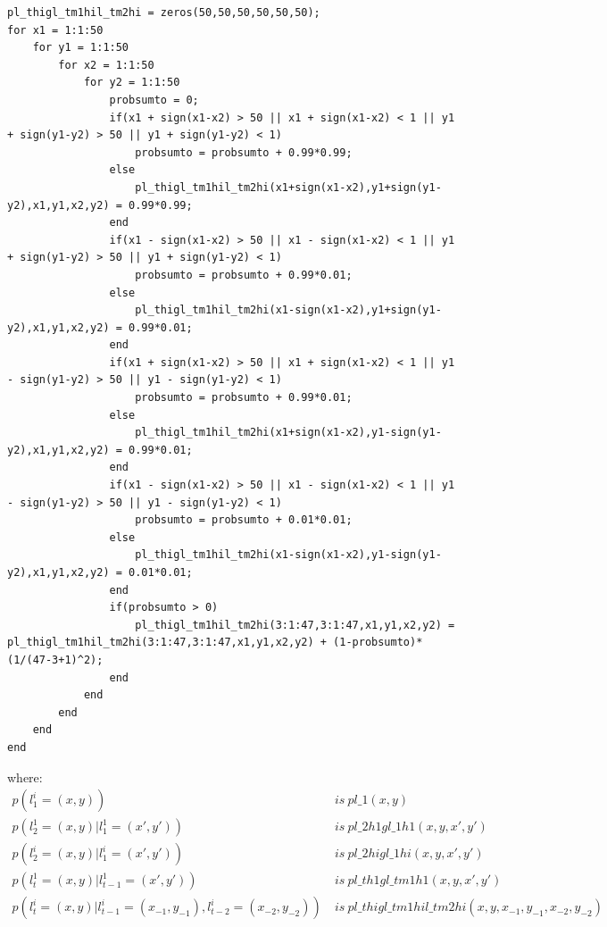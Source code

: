 \documentclass[11pt,a4paper,oneside]{report}
\begin{document}
\begin{lstlisting}
pl_thigl_tm1hil_tm2hi = zeros(50,50,50,50,50,50);
for x1 = 1:1:50
    for y1 = 1:1:50
        for x2 = 1:1:50
            for y2 = 1:1:50
                probsumto = 0;
                if(x1 + sign(x1-x2) > 50 || x1 + sign(x1-x2) < 1 || y1 + sign(y1-y2) > 50 || y1 + sign(y1-y2) < 1)
                    probsumto = probsumto + 0.99*0.99;
                else
                    pl_thigl_tm1hil_tm2hi(x1+sign(x1-x2),y1+sign(y1-y2),x1,y1,x2,y2) = 0.99*0.99;
                end
                if(x1 - sign(x1-x2) > 50 || x1 - sign(x1-x2) < 1 || y1 + sign(y1-y2) > 50 || y1 + sign(y1-y2) < 1)
                    probsumto = probsumto + 0.99*0.01;
                else
                    pl_thigl_tm1hil_tm2hi(x1-sign(x1-x2),y1+sign(y1-y2),x1,y1,x2,y2) = 0.99*0.01;
                end
                if(x1 + sign(x1-x2) > 50 || x1 + sign(x1-x2) < 1 || y1 - sign(y1-y2) > 50 || y1 - sign(y1-y2) < 1)
                    probsumto = probsumto + 0.99*0.01;
                else
                    pl_thigl_tm1hil_tm2hi(x1+sign(x1-x2),y1-sign(y1-y2),x1,y1,x2,y2) = 0.99*0.01;
                end
                if(x1 - sign(x1-x2) > 50 || x1 - sign(x1-x2) < 1 || y1 - sign(y1-y2) > 50 || y1 - sign(y1-y2) < 1)
                    probsumto = probsumto + 0.01*0.01;
                else
                    pl_thigl_tm1hil_tm2hi(x1-sign(x1-x2),y1-sign(y1-y2),x1,y1,x2,y2) = 0.01*0.01;
                end
                if(probsumto > 0)
                    pl_thigl_tm1hil_tm2hi(3:1:47,3:1:47,x1,y1,x2,y2) = pl_thigl_tm1hil_tm2hi(3:1:47,3:1:47,x1,y1,x2,y2) + (1-probsumto)*(1/(47-3+1)^2);
                end
            end
        end
    end
end
\end{lstlisting}

where:\\
\begin{align*}
p(l_1^i=(x,y))&\ is\ pl\_1(x,y)\\
p(l_2^1=(x,y)|l_1^1=(x',y'))&\ is\ pl\_2h1gl\_1h1(x,y,x',y')\\
p(l_2^i=(x,y)|l_1^i=(x',y'))&\ is\ pl\_2higl\_1hi(x,y,x',y')\\
p(l_t^1=(x,y)|l_{t-1}^1=(x',y'))&\ is\ pl\_th1gl\_tm1h1(x,y,x',y')\\
p(l_t^i=(x,y)|l_{t-1}^i=(x_{-1},y_{-1}),l_{t-2}^i=(x_{-2},y_{-2}))&\ is\ pl\_thigl\_tm1hil\_tm2hi(x,y,x_{-1},y_{-1},x_{-2},y_{-2})
\end{align*}
\end{document}
